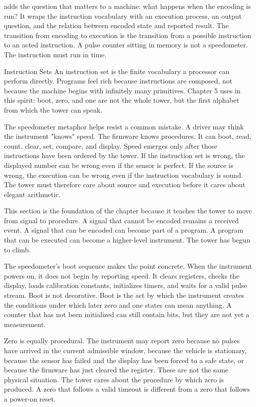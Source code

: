  adds the question that matters to a machine: what happens when
the encoding is run? It wraps the instruction vocabulary with an execution
process, an output question, and the relation between encoded state and
reported result. The transition from encoding to execution is the transition
from a possible instruction to an acted instruction. A pulse counter sitting in
memory is not a speedometer. The instruction must run in time.

\begin{sidebar}{Instruction Sets}
\label{sb:instruction-sets}
An instruction set is the finite vocabulary a processor can perform directly.
Programs feel rich because instructions are composed, not because the machine
begins with infinitely many primitives. Chapter 5 uses  in this
spirit: boot, zero, and one are not the whole tower, but the first alphabet
from which the tower can speak.
\end{sidebar}

The speedometer metaphor helps resist a common mistake. A driver may think the
instrument "knows" speed. The firmware knows procedures. It can boot, read,
count, clear, set, compare, and display. Speed emerges only after those
instructions have been ordered by the tower. If the instruction set is wrong,
the displayed number can be wrong even if the sensor is perfect. If the source
is wrong, the execution can be wrong even if the instruction vocabulary is
sound. The tower must therefore care about source and execution before it cares
about elegant arithmetic.

This section is the foundation of the chapter because it teaches the tower to
move from signal to procedure. A signal that cannot be encoded remains a
received event. A signal that can be encoded can become part of a program. A
program that can be executed can become a higher-level instrument. The tower
has begun to climb.

The speedometer's boot sequence makes the point concrete. When the instrument
powers on, it does not begin by reporting speed. It clears registers, checks
the display, loads calibration constants, initializes timers, and waits for a
valid pulse stream. Boot is not decorative. Boot is the act by which the
instrument creates the conditions under which later zero and one states can
mean anything. A counter that has not been initialized can still contain bits,
but they are not yet a measurement.

Zero is equally procedural. The instrument may report zero because no pulses
have arrived in the current admissible window, because the vehicle is
stationary, because the sensor has failed and the display has been forced to a
safe state, or because the firmware has just cleared the register. These are
not the same physical situation. The tower cares about the procedure by which
zero is produced. A zero that follows a valid timeout is different from a zero
that follows a power-on reset.

